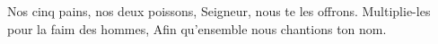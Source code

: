 \beginverse*
Nos cinq pains, nos deux poissons,
Seigneur, nous te les offrons.
Multiplie-les pour la faim des hommes,
Afin qu'ensemble nous chantions ton nom.
\endverse
\endsong
